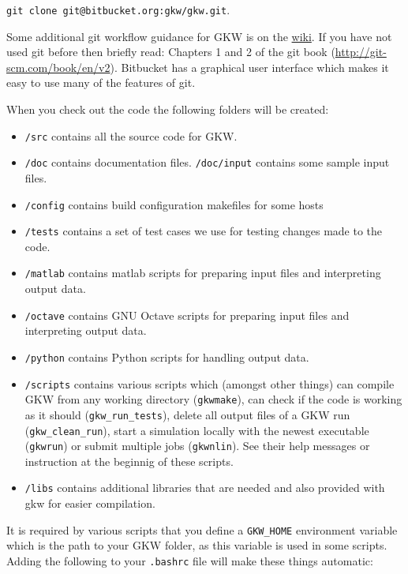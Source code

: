\documentclass[a4paper,10pt]{article}
\begin{document}
\texttt{git clone git@bitbucket.org:gkw/gkw.git}.

Some additional git workflow guidance for GKW is on the \href{https://bitbucket.org/gkw/gkw/wiki/Git_Bitbucket}{wiki}.
If you have not used git before then briefly read: Chapters 1 and 2 of the git book (\href{http://git-scm.com/book/en/v2}{http://git-scm.com/book/en/v2}).  Bitbucket has a graphical user interface which makes it easy to use many of the features of git.

When you check out the code the following folders will be created:
\begin{itemize}
 \item \texttt{/src} contains all the source code for GKW.
 \item \texttt{/doc} contains documentation files. \texttt{/doc/input} contains some sample input files.
 \item \texttt{/config} contains build configuration makefiles for some hosts
 \item \texttt{/tests} contains a set of test cases we use for testing changes made to the code.
 \item \texttt{/matlab} contains matlab scripts for preparing input files and interpreting output data.
 \item \texttt{/octave} contains GNU Octave scripts for preparing input files and interpreting output data.
 \item \texttt{/python} contains Python scripts for handling output data.
 \item \texttt{/scripts} contains various scripts which (amongst other
   things) can compile GKW from any working directory
   (\texttt{gkwmake}), can check if the code is working as it should
   (\texttt{gkw\_run\_tests}), delete all output files of a GKW run
   (\texttt{gkw\_clean\_run}), start a simulation locally with the
   newest executable (\texttt{gkwrun}) or submit multiple jobs
   (\texttt{gkwnlin}). See their help messages or instruction at the
   beginnig of these scripts.
 \item \texttt{/libs} contains additional libraries that are needed
   and also provided with gkw for easier compilation.
\end{itemize}

It is required by various scripts that you define a \texttt{GKW\_HOME}
environment variable which is the path to your GKW folder, as this
variable is used in some scripts. Adding the following to your
\texttt{.bashrc} file will make these things automatic:
\end{document}
